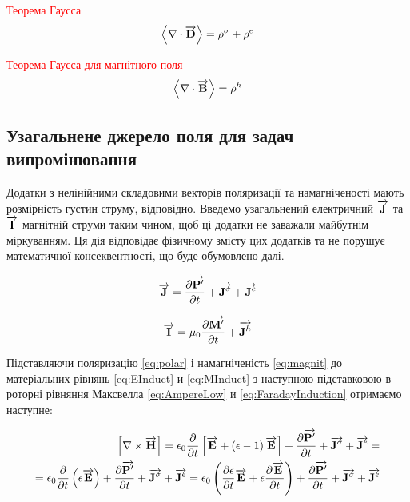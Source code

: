 \textcolor{red}{Теорема Гаусса}
\begin{equation} \label{eq:GaussTheorem}
\left< \nabla \cdot \overrightarrow{\mathbf D} \right> = \rho^\sigma + \rho^e
\end{equation}

\textcolor{red}{Теорема Гаусса для магнітного поля}
\begin{equation} \label{eq:GaussMagnetic}
\left< \nabla \cdot \overrightarrow{\mathbf B} \right> = \rho^h
\end{equation}

\subsection{Узагальнене джерело поля для задач випромінювання}

Додатки з нелінійними складовими векторів поляризації та намагніченості мають
розмірність густин струму, відповідно. Введемо узагальнений електричний 
$ \overrightarrow{\mathbf J} $ та $ \overrightarrow{\mathbf I} $ магнітній струми таким чином, щоб ці додатки 
не заважали майбутнім міркуванням. Ця дія відповідає фізичному змісту цих 
додатків та не порушує математичної консеквентності, що буде обумовлено далі.

\begin{equation*}
\overrightarrow{\mathbf J} = \frac{\partial \overrightarrow{\mathbf P^\prime}}{\partial t} + 
\overrightarrow{\mathbf J^\sigma} + \overrightarrow{\mathbf J^e}
\end{equation*}

\begin{equation*}
\overrightarrow{\mathbf I} = \mu_0 \frac{\partial \overrightarrow{\mathbf M^\prime}}{\partial t} + \overrightarrow{\mathbf J^h}
\end{equation*}

Підставляючи поляризацію \eqref{eq:polar} і намагніченість 
\eqref{eq:magnit} до матеріальних рівнянь \eqref{eq:EInduct} и 
\eqref{eq:MInduct} з наступною підставковою в роторні рівняння Максвелла
\eqref{eq:AmpereLow} и \eqref{eq:FaradayInduction} отримаємо наступне: 

\textcolor{lightgray}{ \begin{equation*} \begin{aligned}
\left[ \nabla \times \overrightarrow{\mathbf H} \right] = \epsilon_0 \frac{\partial }{\partial t} \left[ 
\overrightarrow{\mathbf E} + \left( \epsilon - 1 \right) \overrightarrow{\mathbf E} \right] + 
\frac{\partial \overrightarrow{\mathbf P^\prime}}{\partial t} + \overrightarrow{\mathbf J^\sigma} + \overrightarrow{\mathbf J^e}= \\
= \epsilon_0 \frac{\partial }{\partial t} \left( \epsilon \overrightarrow{\mathbf E} \right) +
\frac{\partial \overrightarrow{\mathbf P^\prime}}{\partial t} + \overrightarrow{\mathbf J^\sigma} + \overrightarrow{\mathbf J^e} = 
\epsilon_0 \left( \frac{\partial \epsilon}{\partial t} 
\overrightarrow{\mathbf E} + \epsilon \frac{\partial \overrightarrow{\mathbf E}}{\partial t} \right) + 
\frac{\partial \overrightarrow{\mathbf P^\prime}}{\partial t} + \overrightarrow{\mathbf J^\sigma} + \overrightarrow{\mathbf J^e}
\end{aligned} \end{equation*} }

